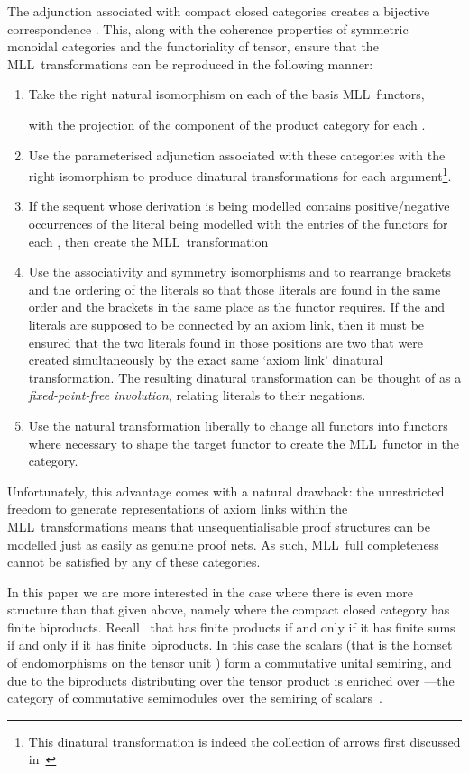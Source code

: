 \documentclass{LMCS}
\theoremstyle{plain}\newtheorem*{cLm}{Claim}
\newcommand{\mll}{MLL} \newcommand{\mall}{MALL}
\newcommand{\p}{} \newcommand{\N}{\mathbb{N}}
\newcommand{\hughc}[1]{#1}
\newcommand{\hughd}[1]{#1}
\begin{document}
\p \hughc{The adjunction associated with compact closed categories creates a bijective correspondence . This, along with the coherence properties of symmetric monoidal categories and the functoriality of tensor, ensure that the \mll~transformations can be reproduced in the following manner:}
\begin{enumerate} \label{CompCCDinatModelling}
\item Take the \hughc{right natural isomorphism} on each of the basis \mll~functors,

with  the projection of the  component of the product category  for each .
\item Use the parameterised adjunction associated with these categories with the \hughc{right isomorphism} to produce dinatural transformations \hughc{ for each argument}\footnote{\hughc{This dinatural transformation is indeed the collection of arrows  first discussed in~\cite{KL80}}}.
\item If the sequent whose derivation is being modelled contains  positive/negative occurrences of the literal being modelled with the  entries of the functors for each , then create the \mll~transformation

\item Use the associativity and symmetry isomorphisms  and  to rearrange brackets and the ordering of the literals so that those literals are found in the same order and the brackets in the same place as the functor requires. If the  and  literals are supposed to be connected by an axiom link, then it must be ensured that the two literals found in those positions are two that were created simultaneously by the exact same `axiom link' dinatural transformation. \hughd{The resulting dinatural transformation can be thought of as a \emph{fixed-point-free involution}, relating literals to their negations.}
\item Use the natural transformation  liberally to change all  functors into  functors where necessary to shape the target functor to create the \mll~functor in the category.
\end{enumerate}

\p\noindent Unfortunately, this advantage comes with a natural drawback: the unrestricted freedom to generate representations of axiom links within the \mll\ transformations means that unsequentialisable proof structures can be modelled just as easily as genuine proof nets. As such, \mll~full completeness cannot be satisfied by any of these categories.

\p In this paper we are more interested in the case where there is even more structure than that given above,
namely where the compact closed category  has finite biproducts.
Recall~\cite{Hou08} that  has finite products if and only if it
has finite sums if and only if it has finite biproducts. In this case
the scalars (that is the homset of endomorphisms on the tensor unit ) form a commutative unital semiring, and due to the
biproducts distributing over the tensor product  is enriched over
---the category of commutative
semimodules over the semiring of scalars~\cite{Heu08}.
\end{document}
